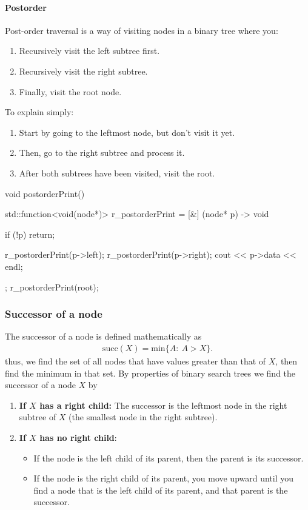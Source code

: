 \documentclass{report}
\begin{document}
\pagebreak 
\paragraph{Postorder}
\bigbreak \noindent \bigbreak \noindent 
Post-order traversal is a way of visiting nodes in a binary tree where you:
\begin{enumerate}
    \item Recursively visit the left subtree first.
    \item Recursively visit the right subtree.
    \item Finally, visit the root node.
\end{enumerate}
To explain simply:
\begin{enumerate}
    \item Start by going to the leftmost node, but don't visit it yet.
    \item Then, go to the right subtree and process it.
    \item After both subtrees have been visited, visit the root.
\end{enumerate}
\bigbreak \noindent 
\begin{cppcode}
    void postorderPrint() {
        std::function<void(node*)> r_postorderPrint = [&] (node* p) -> void {
            if (!p) return;

            r_postorderPrint(p->left);
            r_postorderPrint(p->right);
            cout << p->data << endl;
        };
        r_postorderPrint(root);
    }
\end{cppcode}

\bigbreak \noindent 
\subsubsection{Successor of a node}
\bigbreak \noindent 
The successor of a node is defined mathematically as
\begin{align*}
    \text{succ}(X) = \text{min}\{A:\ A > X\}
.\end{align*}
\bigbreak \noindent 
thus, we find the set of all nodes that have values greater than that of $X$, then find the minimum in that set.
\bigbreak \noindent 
By properties of binary search trees we find the successor of a node $X$ by 
\begin{enumerate}
    \item \textbf{If $X$ has a right child:} The successor is the leftmost node in the right subtree of $X$ (the smallest node in the right subtree).
    \item \textbf{If $X$ has no right child}:
        \begin{itemize}
            \item If the node is the left child of its parent, then the parent is its successor.
            \item If the node is the right child of its parent, you move upward until you find a node that is the left child of its parent, and that parent is the successor.
        \end{itemize}
\end{enumerate}
\end{document}
